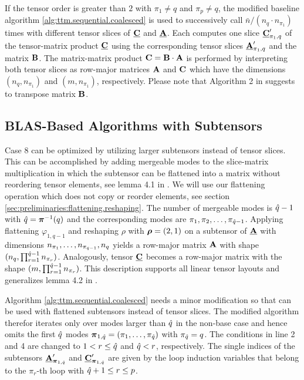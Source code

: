If the tensor order is greater than $2$ with $\pi_1\neq q$ and $\pi_p \neq q$, the modified baseline algorithm \ref{alg:ttm.sequential.coalesced} is used to successively call $\bar{n} / (n_q \cdot n_{\pi_1})$ times  with different tensor slices of $\underline{\mathbf{C}}$ and $\underline{\mathbf{A}}$.
Each  computes one slice $\underline{\mathbf{C}}_{\pi_1,q}'$ of the tensor-matrix product $\underline{\mathbf{C}}$ using the corresponding tensor slices $\underline{\mathbf{A}}_{\pi_1,q}'$ and the matrix $\mathbf{B}$.
The matrix-matrix product $\mathbf{C} = \mathbf{B} \cdot \mathbf{A}$ is performed by interpreting both tensor slices as row-major matrices $\mathbf{A}$ and $\mathbf{C}$ which have the dimensions $(n_q,n_{\pi_1})$ and $(m,n_{\pi_1})$, respectively.
Please note that Algorithm 2 in \cite{li:2015:input} suggests to transpose matrix $\mathbf{B}$.

\subsection{BLAS-Based Algorithms with Subtensors}
\label{sec:design:blas.based.algorithm.subtensors}
Case 8 can be optimized by utilizing larger subtensors instead of tensor slices.
This can be accomplished by adding mergeable modes to the slice-matrix multiplication in which the subtensor can be flattened into a matrix without reordering tensor elements, see lemma 4.1 in \cite{li:2015:input}.
We will use our flattening operation which does not copy or reorder elements, see section \ref{sec:preliminaries:flattening.reshaping}.
The number of mergeable modes is $\hat{q}-1$ with $\hat{q} = \boldsymbol{\pi}^{-1}(q)$ and the corresponding modes are $\pi_1,\pi_2,\dots,\pi_{\hat{q}-1}$.
Applying flattening $\varphi_{1,q-1}$ and reshaping $\rho$ with $\boldsymbol{\rho} = (2,1)$ on a subtensor of $\underline{\mathbf{A}}$ with dimensions $n_{\pi_1},\dots,n_{\pi_{\hat{q}-1}}, n_{q}$ yields a row-major matrix $\mathbf{A}$ with shape $(n_q,\prod_{r=1}^{\hat{q}-1} n_{\pi_r})$.
Analogously, tensor $\underline{\mathbf{C}}$ becomes a row-major matrix with the shape $(m, \prod_{r=1}^{\hat{q}-1} n_{\pi_r})$.
This description supports all linear tensor layouts and generalizes lemma 4.2 in \cite{li:2015:input}.

Algorithm \ref{alg:ttm.sequential.coalesced} needs a minor modification so that  can be used with flattened subtensors instead of tensor slices.
The modified algorithm therefor iterates only over modes larger than $\hat{q}$ in the non-base case and hence omits the first $\hat{q}$ modes $\boldsymbol{\pi}_{1,\hat{q}} = (\pi_1, \dots, \pi_{\hat{q}})$ with $\pi_{\hat{q}} = q$.
The conditions in line 2 and 4 are changed to $1 < r \leq \hat{q}$ and $\hat{q} < r$, respectively.
The single indices of the subtensors $\underline{\mathbf{A}}_{\boldsymbol{\pi}_{1,\hat{q}}}'$ and $\underline{\mathbf{C}}_{\boldsymbol{\pi}_{1,\hat{q}}}'$ are given by the loop induction variables that belong to the $\pi_r$-th loop with $\hat{q}+1 \leq r \leq p$.  
 
